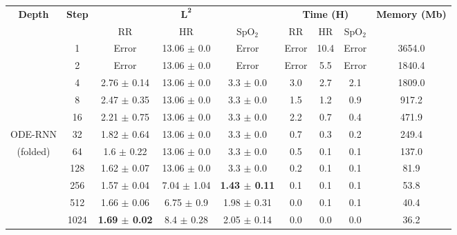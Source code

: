 \documentclass{article}
\begin{document}
\begin{table*}[t]
    \small
    \begin{center}
        \begin{tabular}{ccccccccc}
        \toprule
        \multirow{2}{*}{\textbf{Depth}} & \multirow{2}{*}{\textbf{Step}} & \multicolumn{3}{c}{$\mathbf{L^2}$} & \multicolumn{3}{c}{\textbf{Time (H)}} & \multirow{2}{*}{\textbf{Memory (Mb)}} \\
        \cmidrule(lr){3-5} \cmidrule(lr){6-8}
        & & RR & HR & SpO$_2$ & RR & HR & SpO$_2$ & \\
        \midrule
         & 1    &    Error &  13.06 $\pm$ 0.0 & Error &           Error &          10.4 &           Error &             3654.0 \\
          & 2    &    Error &  13.06 $\pm$ 0.0 &  Error &           Error &           5.5 &           Error &             1840.4 \\
          & 4    &  2.76 $\pm$ 0.14 &  13.06 $\pm$ 0.0 &    3.3 $\pm$ 0.0 &           3.0 &           2.7 &           2.1 &             1809.0 \\
          & 8    &  2.47 $\pm$ 0.35 &  13.06 $\pm$ 0.0 &    3.3 $\pm$ 0.0 &           1.5 &           1.2 &           0.9 &              917.2 \\
          & 16   &  2.21 $\pm$ 0.75 &  13.06 $\pm$ 0.0 &    3.3 $\pm$ 0.0 &           2.2 &           0.7 &           0.4 &              471.9 \\
        ODE-RNN   & 32   &  1.82 $\pm$ 0.64 &  13.06 $\pm$ 0.0 &    3.3 $\pm$ 0.0 &           0.7 &           0.3 &           0.2 &              249.4 \\
        (folded)  & 64   &   1.6 $\pm$ 0.22 &  13.06 $\pm$ 0.0 &    3.3 $\pm$ 0.0 &           0.5 &           0.1 &           0.1 &              137.0 \\
          & 128  &  1.62 $\pm$ 0.07 &  13.06 $\pm$ 0.0 &    3.3 $\pm$ 0.0 &           0.2 &           0.1 &           0.1 &               81.9 \\
          & 256  &  1.57 $\pm$ 0.04 &  7.04 $\pm$ 1.04 &  \textbf{1.43 $\pm$ 0.11} &           0.1 &           0.1 &           0.1 &               53.8 \\
          & 512  &  1.66 $\pm$ 0.06 &   6.75 $\pm$ 0.9 &  1.98 $\pm$ 0.31 &           0.0 &           0.1 &           0.1 &               40.4 \\
          & 1024 &  \textbf{1.69 $\pm$ 0.02} &   8.4 $\pm$ 0.28 &  2.05 $\pm$ 0.14 &           0.0 &           0.0 &           0.0 &               36.2 \\

\end{tabular}
\end{center}
\end{table*}
\end{document}
